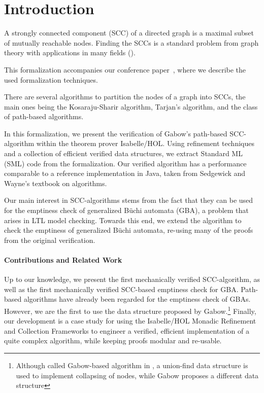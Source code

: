 \section{Introduction}\label{sec:intro}
A strongly connected component (SCC) of a directed graph is a maximal subset of mutually reachable nodes.
Finding the SCCs is a standard problem from graph theory with applications in many fields (\cite[Chap.~4.2]{SeWa11}).

This formalization accompanies our conference paper~\cite{La14_ITP}, where 
we describe the used formalization techniques.

There are several algorithms to partition the nodes of a graph into SCCs, the main ones being the Kosaraju-Sharir algorithm\cite{Sharir81},
Tarjan's algorithm\cite{Tarjan72}, and the class of path-based algorithms\cite{Purdom70,Munro71,Dijk76,ChMe96,Gabow00}.

In this formalization, we present the verification of Gabow's path-based SCC-algorithm\cite{Gabow00} within the theorem prover Isabelle/HOL\cite{npw02}.
Using refinement techniques and a collection of efficient verified data structures, we extract Standard ML (SML)\cite{MTHM97} code from
the formalization. Our verified algorithm has a performance comparable to a reference implementation in Java, taken from Sedgewick and Wayne's textbook on algorithms\cite[Chap.~4.2]{SeWa11}.

Our main interest in SCC-algorithms stems from the fact that they can be used for the emptiness check of generalized B\"uchi automata (GBA),
a problem that arises in LTL model checking\cite{VaWo94,GeVa05,CDP05}. Towards this end, we extend the algorithm to check the emptiness of generalized B\"uchi automata,
re-using many of the proofs from the original verification.

\paragraph{Contributions and Related Work}
Up to our knowledge, we present the first mechanically verified SCC-algorithm, as well as the first mechanically verified SCC-based emptiness check
for GBA. Path-based algorithms have already been regarded for the emptiness check of GBAs\cite{RDKP13}. However,
we are the first to use the data structure proposed by Gabow\cite{Gabow00}.\footnote{Although called Gabow-based algorithm in \cite{RDKP13},
a union-find data structure is used to implement collapsing of nodes, while Gabow proposes a different data structure\cite[pg.~109]{Gabow00}}
Finally, our development is a case study for using the Isabelle/HOL Monadic Refinement and Collection Frameworks\cite{LL10,LaTu12,La12,La13} to
engineer a verified, efficient implementation of a quite complex algorithm, while keeping proofs modular and re-usable.

